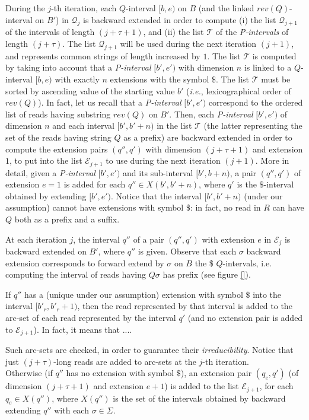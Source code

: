 \documentclass[runningheads,envcountsame,a4paper]{llncs}
\newcommand{\notaestesa}[2]{%
  {\sffamily {\bfseries #1}{\footnotesize #2}}%
  \marginpar{\framebox{\Large *}}%
}
\newcommand{\ie}{\textit{i.e.},\xspace}
\begin{document}
During the $j$-th iteration, each $Q$-interval $[b, e)$ on $B$ (and the linked $rev(Q)$-interval on $B'$) in $\mathcal{Q}_j$ is backward extended in order to compute (i) the list $\mathcal{Q}_{j+1}$ of the intervals of length $(j+\tau+1)$, and (ii) the list $\mathcal{T}$ of the \emph{P-intervals} of length $(j+\tau)$.
The list $\mathcal{Q}_{j+1}$ will be used during the next iteration $(j+1)$, and represents common strings of length increased by $1$. The list $\mathcal{T}$ is computed by taking into account that a \emph{P-interval} $[b', e')$ with dimension $n$ is linked to a $Q$-interval $[b, e)$ with exactly $n$ extensions with the symbol $\$$.
The list $\mathcal{T}$ must be sorted by ascending value of the starting value $b'$ (\ie lexicographical order of $rev(Q)$). In fact, let us recall that a \emph{P-interval} $[b', e')$  correspond to the ordered list of  reads having substring $rev(Q)$ on $B'$.   Then, each \emph{P-interval} $[b', e')$ of dimension $n$ and each interval $[b', b'+n)$ in the list $\mathcal{T}$ (the latter representing the set of the reads having string $Q$ as a prefix) are backward extended in order to compute the extension pairs $(q'', q')$ with dimension $(j+\tau+1)$ and extension $1$, to put into the list $\mathcal{E}_{j+1}$ to use during the next iteration $(j+1)$. More in detail, given a \emph{P-interval} $[b',e')$ and its sub-interval $[b',b+n)$, a pair $(q'',q')$ of extension $e=1$ is added for each $q'' \in X(b',b'+n)$, where $q'$ is the $\$$-interval obtained by extending $[b',e')$. Notice that the interval $[b', b'+n)$ (under our assumption) cannot have extensions with symbol $\$$: in fact, no read in $R$ can have $Q$ both as a prefix and a suffix.

At each iteration $j$, the interval $q''$ of a pair $(q'', q')$ with extension $e$ in $\mathcal{E}_j$ is backward extended on $B'$, where $q''$ is given. Observe that each $\sigma$  backward extension corresponds to forward extend by $\sigma$ on $B$ the  \$ $Q$-intervals, i.e. computing the interval of reads having $Q \sigma$ has prefix (see figure \ref{}).


If $q''$ has a (unique under our assumption) extension with symbol $\$$ into the interval $[b'_r, b'_r+1)$, then the read represented by that interval is added to the arc-set of each read represented by the interval $q'$ (and no extension pair is added to $\mathcal{E}_{j+1}$).
\notaestesa{Paola}{qua occorre dire il perchè} In fact, it means that ....

Such arc-sets are checked, in order to guarantee their \emph{irreducibility}. Notice that just $(j+\tau)$-long reads are added to arc-sets at the $j$-th iteration.\\
Otherwise (if $q''$ has no extension with symbol $\$$), an extension pair $(q_e, q')$ (of dimension $(j+\tau+1)$ and extension $e+1$) is added to the list $\mathcal{E}_{j+1}$, for each $q_e \in X(q'')$, where $X(q'')$ is the set of the intervals obtained by backward extending $q''$ with each $\sigma \in \Sigma$.
\end{document}

